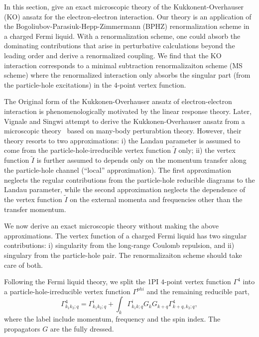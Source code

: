 \documentclass[reprint,amsmath,amssymb,aps,prb]{revtex4-1}
\begin{document}
In this section, give an exact microscopic theory of the Kukkonent-Overhauser (KO) ansatz for the electron-electron interaction.
Our theory is an application of the Bogoliubov-Parasiuk-Hepp-Zimmermann (BPHZ) renormalization scheme in a charged Fermi liquid.
With a renormalization scheme, one could absorb the dominating contributions that arise in perturbative calculations beyond the leading order
and derive a renormalized coupling.
We find that the KO interaction corresponds to a minimal subtraction renormalizaiton scheme (MS scheme) where the renormalized interaction only absorbs the
singular part (from the particle-hole excitations) in the $4$-point vertex function.

The Original form of the Kukkonen-Overhauser ansatz of electron-electron interaction is phenomenologically motivated by the linear response theory\cite{kukkonen}.
Later, Vignale and Singwi attempt to derive the Kukkonen-Overhauser ansatz from a microscopic theory~\cite{vignale1} based on many-body perturabtion theory.
However, their theory resorts to two approximations: i) the Landau parameter is assumed to come from the particle-hole-irreducible vertex function $\tilde{I}$ only;
ii) the vertex function $\tilde{I}$ is further assumed to depends only on the momentum transfer along the particle-hole channel (``local'' approximation).
The first approximation neglects the regular contributions from the particle-hole reducible diagrams to the Landau parameter, while the second
approximation neglects the dependence of the vertex function $\tilde{I}$ on the external momenta and frequencies other than the transfer momentum.

We now derive an exact microscopic theory without making the above approximations.
The vertex function of a charged Fermi liquid has two singular contributions: i) singularity from the long-range Coulomb repulsion, and
ii) singulary from the particle-hole pair. The renormalizaiton scheme should take care of both.

Following the Fermi liquid theory,
we split the 1PI $4$-point vertex function $\Gamma^4$ into a particle-hole-irreducible vertex function $\Gamma^{phi}$
and the remaining reducible part,
\begin{equation}
    \label{eq:particle-hole-sc}
    \Gamma^4_{k_1k_2;q}=\Gamma^{i}_{k_1k_2;q}+\int_{k}\Gamma^{i}_{k_1k;q}G_{k}G_{k+q}\Gamma^4_{k+q,k_2;q},
\end{equation}
where the label include momentum, frequency and the spin index. The propagators $G$ are the fully dressed.
\end{document}
